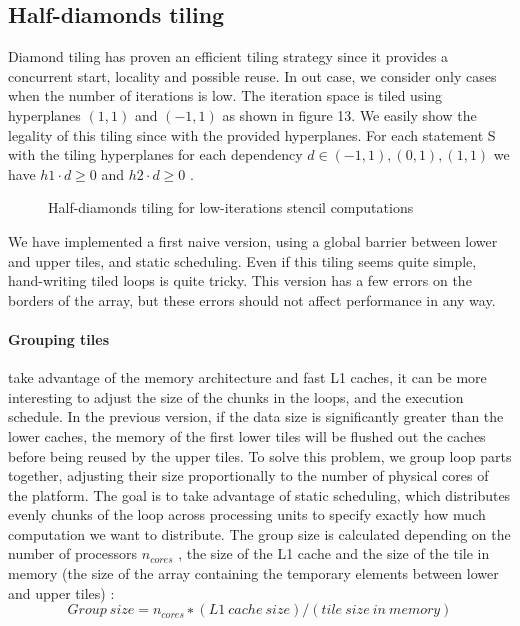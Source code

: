\documentclass[a4paper,11pt]{article}
\begin{document}
\subsection{Half-diamonds tiling}
Diamond tiling has proven an efficient tiling strategy since it provides a concurrent start,
locality and possible reuse. In out case, we consider only cases when the number of
iterations is low. The iteration space is tiled using hyperplanes $(1, 1)$ and $(−1, 1)$ as
shown in figure 13. We easily show the legality of this tiling since with the provided
hyperplanes. For each statement S with the tiling hyperplanes for each dependency $d \in
{(−1, 1), (0, 1), (1, 1)}$  we have $h1 \cdot d \geq 0$ and $h2 \cdot d \geq 0$ . \\

\begin{figure}[h]
  \begin{center}
    
  \end{center}
  \caption{Half-diamonds tiling for low-iterations stencil computations}
  \label{hdiam_tiling}
\end{figure}


We have implemented a first naive version, using a global barrier between lower and
upper tiles, and static scheduling. Even if this tiling seems quite simple, hand-writing
tiled loops is quite tricky. This version has a few errors on the borders of the array, but
these errors should not affect performance in any way. \\
\paragraph{Grouping tiles} take advantage of the memory architecture and fast L1 caches, it can be
more interesting to adjust the size of the chunks in the loops, and the execution schedule.
In the previous version, if the data size is significantly greater than the lower caches, the
memory of the first lower tiles will be flushed out the caches before being reused by the
upper tiles. To solve this problem, we group loop parts together, adjusting their size proportionally 
to the number of physical cores of the platform. The goal is to take advantage
of static scheduling, which distributes evenly chunks of the loop across processing units to
specify exactly how much computation we want to distribute. The group size is calculated
depending on the number of processors $n_{cores}$ , the size of the L1 cache and the size of the
tile in memory (the size of the array containing the temporary elements between lower
and upper tiles) :
\[Group \ size = n_{cores} ∗ (L1 \ cache \ size) / (tile \ size \  in \  memory)\]
\end{document}
